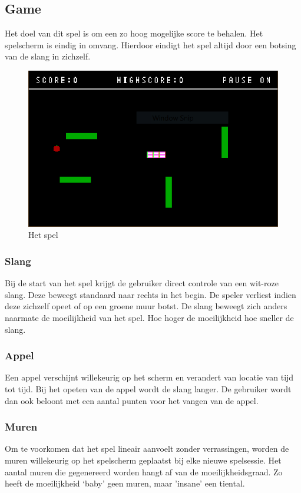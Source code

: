 \documentclass[11pt,a4paper]{article}
\begin{document}
\subsection{Game}
Het doel van dit spel is om een zo hoog mogelijke score te behalen. Het spelscherm is eindig in omvang. Hierdoor eindigt het spel altijd door een botsing van de slang in zichzelf.

\begin{figure}[h]
\centering
\includegraphics[scale=1]{game.png}
\caption{Het spel}
\label{fig:game}
\end{figure}

\subsubsection{Slang}
Bij de start van het spel krijgt de gebruiker direct controle van een wit-roze slang. Deze beweegt standaard naar rechts in het begin. De speler verliest indien deze zichzelf opeet of op een groene muur botst. De slang beweegt zich anders naarmate de moeilijkheid van het spel. Hoe hoger de moeilijkheid hoe sneller de slang.


\subsubsection{Appel}
Een appel verschijnt willekeurig op het scherm en verandert van locatie van tijd tot tijd. Bij het opeten van de appel wordt de slang langer. De gebruiker wordt dan ook beloont met een aantal punten voor het vangen van de appel. 

\subsubsection{Muren}
Om te voorkomen dat het spel lineair aanvoelt zonder verrassingen, worden de muren willekeurig op het spelscherm geplaatst bij elke nieuwe spelsessie. Het aantal muren die gegenereerd worden hangt af van de moeilijkheidsgraad. Zo heeft de moeilijkheid ‘baby’ geen muren, maar 'insane' een tiental.
\end{document}
